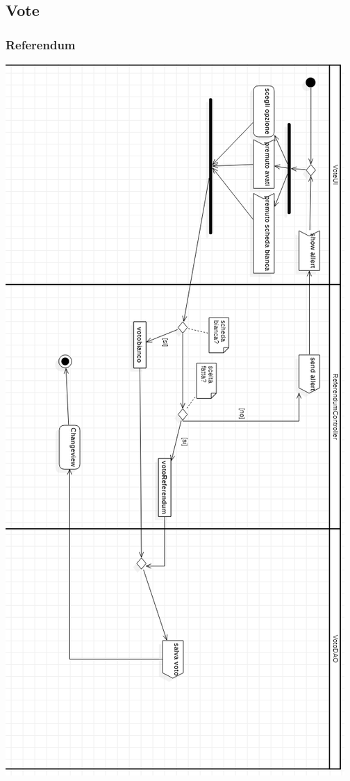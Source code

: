 \documentclass[11pt, oneside]{article}   	%
\begin{document}
\subsection{Vote}
\subsubsection{Referendum}
    \begin{center}
    \includegraphics[scale=0.5]{images/ReferendumActivity.png}
    \end{center}
    \pagebreak
\end{document}
